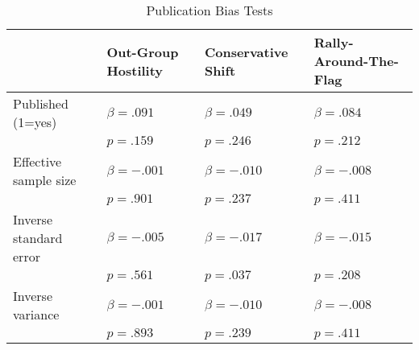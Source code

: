 \vspace{3mm}
\begin{table}[H]
\caption{Publication Bias Tests}
\label{tab:art4-app-tab2}
\small
\begin{tabular}{@{}llll@{}}
\toprule
& Out-Group Hostility & Conservative Shift & Rally-Around-The-Flag \\ \midrule
Published (1=yes) & $\beta = .091$ & $\beta = .049$ & $\beta = .084$ \\
 & $p = .159$ & $p = .246$ & $p = .212$ \\
Effective sample size & $\beta = -.001$ & $\beta = -.010$ & $\beta = -.008$ \\
 & $p = .901$ & $p = .237$ & $p = .411$ \\
Inverse standard error & $\beta = -.005$ & $\beta = -.017$ & $\beta = -.015$ \\
 & $p = .561$ & $p = .037$ & $p = .208$ \\
Inverse variance & $\beta = -.001$ & $\beta = -.010$ & $\beta = -.008$ \\
 & $p = .893$ & $p = .239$ & $p = .411$ \\ \bottomrule
\end{tabular}
\end{table}

\clearpage